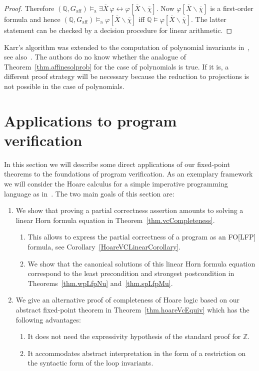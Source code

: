 \documentclass[acmsmall]{acmart}
\theoremstyle{plain}
\theoremstyle{definition}
\newcommand{\mybar}[1]{\overline{#1}}
\newcommand{\Int}{\mathbb{Z}}
\newcommand{\Rat}{\mathbb{Q}}
\newcommand{\sop}{[} %
\newcommand{\scl}{]} %
\newcommand{\sel}[2]{#1 \backslash #2} %
\newcommand{\unsubst}[2]{\sop \sel{#1}{#2} \scl} %
\newcommand{\aff}{{\mathrm{aff}}}
\newcommand{\modelsa}{\models_\mathrm{a}} %
\begin{document}
\begin{proof}
	Therefore $(\Rat,G_{\aff}) \modelsa \exists \mybar{X}\, \varphi \leftrightarrow \varphi\unsubst{\mybar{X}}{\mybar{\chi}}$.
	Now $\varphi\unsubst{\mybar{X}}{\mybar{\chi}}$ is a first-order formula and hence $(\Rat,G_{\aff}) \modelsa \varphi\unsubst{\mybar{X}}{\mybar{\chi}}$
	iff $\Rat \models \varphi\unsubst{\mybar{X}}{\mybar{\chi}}$.
	The latter statement can be checked by a decision procedure for linear arithmetic.
\end{proof}

Karr's algorithm was extended to the computation of polynomial invariants
 in~\cite{RodriguezCarbonell07Automatic,RodriguezCarbonell07Generating}, see
 also~\cite{Hrushovski18Polynomial,Hrushovski23Strongest}.
The authors do no know whether the analogue of Theorem~\ref{thm.affinesolprob} for the case of
 polynomials is true.
If it is, a different proof strategy will be necessary because the reduction to projections
 is not possible in the case of polynomials.

\section{Applications to program verification}\label{sec.app_prog_verif}

In this section we will describe some direct applications of our fixed-point theorems to
 the foundations of program verification.
As an exemplary framework we will consider the Hoare calculus for a simple
 imperative programming language as in~\cite{Winskel93Formal}.
The two main goals of this section are:
%
\begin{enumerate}
\item We show that proving a partial correctness assertion amounts to
 solving a linear Horn formula equation in Theorem~\ref{thm.vcCompleteness}.
\begin{enumerate}
\item This allows to express the partial correctness of a program as an FO[LFP] formula,
 see Corollary~\ref{HoareVCLinearCorollary}.
\item We show that the canonical solutions of this linear Horn formula equation correspond
 to the least precondition and strongest postcondition in Theorems~\ref{thm.wpLfpNu}
 and~\ref{thm.spLfpMu}.
\end{enumerate}

\item We give an alternative proof of completeness of Hoare logic based on our abstract
 fixed-point theorem in Theorem~\ref{thm.hoareVcEquiv} which has the following advantages:
\begin{enumerate}
\item It does not need the expressivity hypothesis of the standard proof for $\Int$.
\item It accommodates abstract interpretation in the form of a restriction on the syntactic
 form of the loop invariants.
\end{enumerate}
\end{enumerate}
\end{document}
